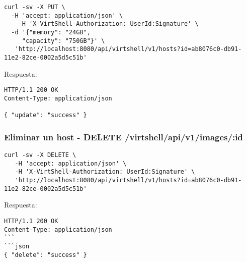 \begin{lstlisting}[style=json]
curl -sv -X PUT \
  -H 'accept: application/json' \
    -H 'X-VirtShell-Authorization: UserId:Signature' \
  -d '{"memory": "24GB",
     "capacity": "750GB"}' \
   'http://localhost:8080/api/virtshell/v1/hosts?id=ab8076c0-db91-11e2-82ce-0002a5d5c51b'
\end{lstlisting}

\vspace{1cm}
Respuesta:
\vspace{1cm}

\begin{lstlisting}[style=json]
HTTP/1.1 200 OK
Content-Type: application/json

{ "update": "success" }
\end{lstlisting}

\subsubsection{Eliminar un host - DELETE /virtshell/api/v1/images/:id}

\begin{lstlisting}[style=json]
curl -sv -X DELETE \
   -H 'accept: application/json' \
   -H 'X-VirtShell-Authorization: UserId:Signature' \
   'http://localhost:8080/api/virtshell/v1/hosts?id=ab8076c0-db91-11e2-82ce-0002a5d5c51b'
\end{lstlisting}

\vspace{1cm}
Respuesta:
\vspace{1cm}

\begin{lstlisting}[style=json]
HTTP/1.1 200 OK
Content-Type: application/json
```
```json
{ "delete": "success" }
\end{lstlisting}
